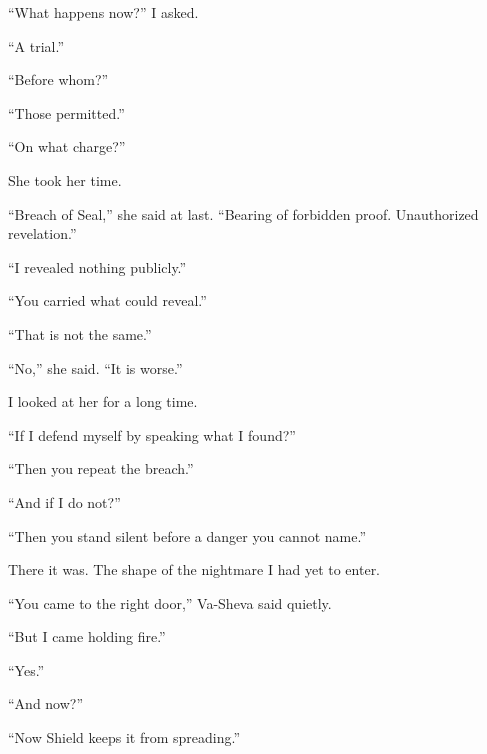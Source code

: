 ``What happens now?'' I asked.\par

``A trial.''\par

``Before whom?''\par

``Those permitted.''\par

``On what charge?''\par

She took her time.\par

``Breach of Seal,'' she said at last. ``Bearing of forbidden proof. Unauthorized revelation.''\par

``I revealed nothing publicly.''\par

``You carried what could reveal.''\par

``That is not the same.''\par

``No,'' she said. ``It is worse.''\par

I looked at her for a long time.\par

``If I defend myself by speaking what I found?''\par

``Then you repeat the breach.''\par

``And if I do not?''\par

``Then you stand silent before a danger you cannot name.''\par

There it was. The shape of the nightmare I had yet to enter.\par

``You came to the right door,'' Va-Sheva said quietly.\par

``But I came holding fire.''\par

``Yes.''\par

``And now?''\par

``Now Shield keeps it from spreading.''\par

